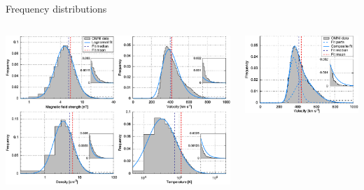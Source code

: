 \begin{frame}[c]{Frequency distributions}{}
	\begin{columns}[c]	%
	
		\hspace*{-21pt}
		\includegraphics[width=1.1\textwidth]{../figures_paper/histogram_fits_4_a_zoom_paper_pdfplot.pdf}

	
		\hspace*{-10pt}
		\includegraphics[width=1.2\textwidth]{../figures_paper/histogram_fits_V_a_zoom_dbl_paper_pdfplot.pdf}

	\end{columns}
	\vspace*{\fill} \hfill \hyperlink{lognormal_distribution}{}
\end{frame}
